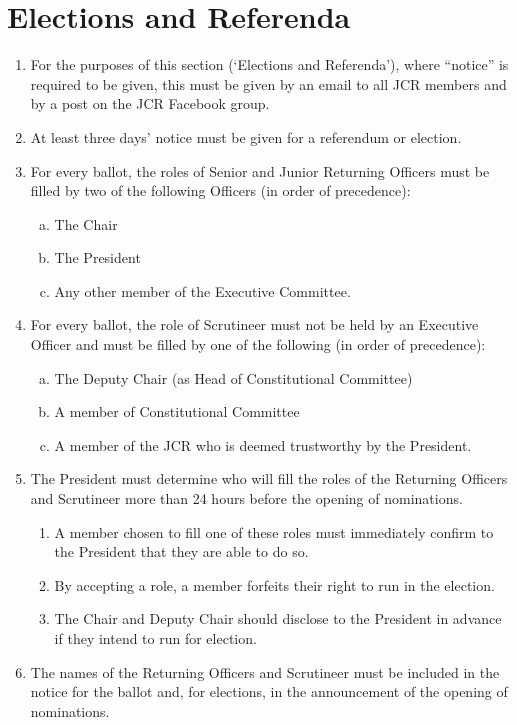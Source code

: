 \documentclass[12pt]{article}
\begin{document}
\section{Elections and Referenda}
\begin{enumerate}
    \item For the purposes of this section (‘Elections and Referenda’), where “notice” is required to be given, this must be given by an email to all JCR members and by a post on the JCR Facebook group.
    \item At least three days’ notice must be given for a referendum or election.
    \item For every ballot, the roles of Senior and Junior Returning Officers must be filled by two of the following Officers (in order of precedence):
    \begin{enumerate}[(a)]
        \item The Chair
        \item The President
        \item Any other member of the Executive Committee.
    \end{enumerate}
    \item For every ballot, the role of Scrutineer must not be held by an Executive Officer and must be filled by one of the following (in order of precedence):
    \begin{enumerate}[(a)]
        \item The Deputy Chair (as Head of Constitutional Committee)
        \item A member of Constitutional Committee
        \item A member of the JCR who is deemed trustworthy by the President.
    \end{enumerate}
    \item The President must determine who will fill the roles of the Returning Officers and Scrutineer more than 24 hours before the opening of nominations.
    \begin{enumerate}
        \item A member chosen to fill one of these roles must immediately confirm to the President that they are able to do so.
        \item By accepting a role, a member forfeits their right to run in the election.
        \item The Chair and Deputy Chair should disclose to the President in advance if they intend to run for election.
    \end{enumerate}
    \item The names of the Returning Officers and Scrutineer must be included in the notice for the ballot and, for elections, in the announcement of the opening of nominations.

\end{enumerate}
\end{document}

